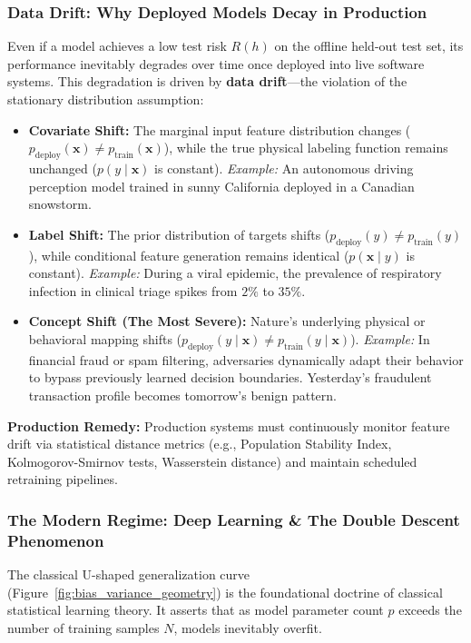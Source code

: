 \subsubsection{Data Drift: Why Deployed Models Decay in Production}
Even if a model achieves a low test risk $R(h)$ on the offline held-out test set, its performance inevitably degrades over time once deployed into live software systems. This degradation is driven by \textbf{data drift}—the violation of the stationary distribution assumption:
\begin{itemize}
    \item \textbf{Covariate Shift:} The marginal input feature distribution changes ($p_{\text{deploy}}(\mathbf{x}) \ne p_{\text{train}}(\mathbf{x})$), while the true physical labeling function remains unchanged ($p(y \mid \mathbf{x})$ is constant). \emph{Example:} An autonomous driving perception model trained in sunny California deployed in a Canadian snowstorm.
    \item \textbf{Label Shift:} The prior distribution of targets shifts ($p_{\text{deploy}}(y) \ne p_{\text{train}}(y)$), while conditional feature generation remains identical ($p(\mathbf{x} \mid y)$ is constant). \emph{Example:} During a viral epidemic, the prevalence of respiratory infection in clinical triage spikes from $2\%$ to $35\%$.
    \item \textbf{Concept Shift (The Most Severe):} Nature's underlying physical or behavioral mapping shifts ($p_{\text{deploy}}(y \mid \mathbf{x}) \ne p_{\text{train}}(y \mid \mathbf{x})$). \emph{Example:} In financial fraud or spam filtering, adversaries dynamically adapt their behavior to bypass previously learned decision boundaries. Yesterday's fraudulent transaction profile becomes tomorrow's benign pattern.
\end{itemize}
\textbf{Production Remedy:} Production systems must continuously monitor feature drift via statistical distance metrics (e.g., Population Stability Index, Kolmogorov-Smirnov tests, Wasserstein distance) and maintain scheduled retraining pipelines.

\subsubsection{The Modern Regime: Deep Learning \& The Double Descent Phenomenon}
The classical U-shaped generalization curve (Figure~\ref{fig:bias_variance_geometry}) is the foundational doctrine of classical statistical learning theory. It asserts that as model parameter count $p$ exceeds the number of training samples $N$, models inevitably overfit.

